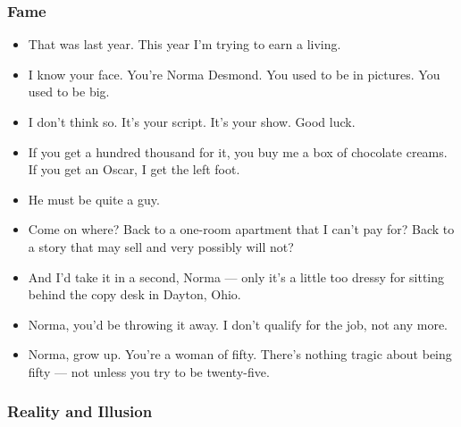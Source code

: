 \documentclass[a4paper]{article}
\begin{document}
\subsubsection{Fame}
\begin{itemize}
\item That was last year. This year I'm trying to earn a living.
\item I know your face. You're Norma Desmond. You used to be in pictures. You used to be big.
\item I don't think so. It's your script. It's your show. Good luck.
\item If you get a hundred thousand for it, you buy me a box of chocolate creams. If you get an Oscar, I get the left foot.
\item He must be quite a guy.
\item Come on where? Back to a one-room apartment that I can't pay for? Back to a story that may sell and very possibly will not?
\item And I'd take it in a second, Norma — only it's a little too dressy for sitting behind the copy desk in Dayton, Ohio.
\item Norma, you'd be throwing it away. I don't qualify for the job, not any more.
\item Norma, grow up. You're a woman of fifty. There's nothing tragic about being fifty — not unless you try to be twenty-five.
\end{itemize}

\subsubsection{Reality and Illusion}
\end{document}
